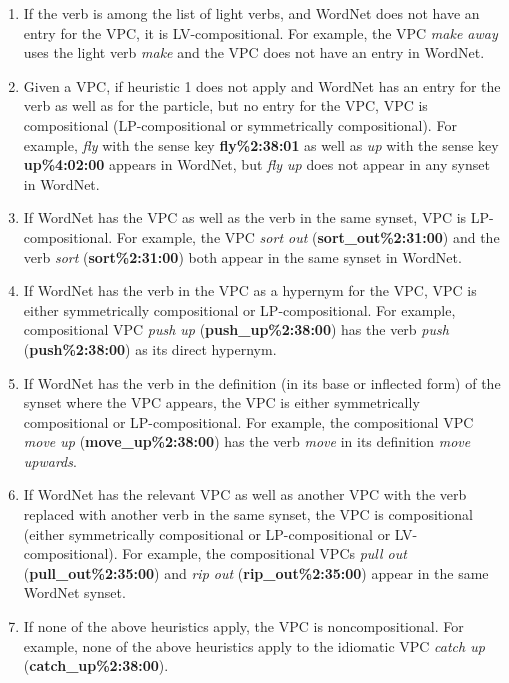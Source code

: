 \documentclass[output=paper
,modfonts
,nonflat]{langsci/langscibook}
\begin{document}
\begin{enumerate}
\setlength\itemsep{0em}
\item If the verb is among the list of light verbs, and WordNet does not have an entry for the VPC, it is LV-compositional. For example, the VPC \textit{make away} uses the light verb \textit{make} and the VPC does not have an entry in WordNet.

\item Given a VPC, if heuristic 1 does not apply and WordNet has an entry for the verb as well as for the particle, but no entry for the VPC, VPC is compositional (LP-compositional or symmetrically compositional). For example, \textit{fly} with the sense key \textbf{fly\%2:38:01} as well as \textit{up} with the sense key \textbf{up\%4:02:00} appears in WordNet, but \textit{fly up} does not appear in any synset in WordNet.

\item If WordNet has the VPC as well as the verb in the same synset, VPC is LP-compositional. For example, the VPC \textit{sort out} (\textbf{sort\_out\%2:31:00}) and the verb \textit{sort} (\textbf{sort\%2:31:00}) both appear in the same synset in WordNet.

\item If WordNet has the verb in the VPC as a hypernym for the VPC, VPC is either symmetrically compositional or LP-compositional. For example, compositional VPC \textit{push up} (\textbf{push\_up\%2:38:00}) has the verb \textit{push} (\textbf{push\%2:38:00}) as its direct hypernym.

\item If WordNet has the verb in the definition (in its base or inflected form) of the synset where the VPC appears, the VPC is either symmetrically compositional or LP-compositional. For example, the compositional VPC \textit{move up} (\textbf{move\_up\%2:38:00}) has the verb \textit{move} in its definition \textit{move upwards}.

\item If WordNet has the relevant VPC as well as another VPC with the verb replaced with another verb in the same synset, the VPC is compositional (either symmetrically compositional or LP-compositional or LV-compositional). For example, the compositional VPCs \textit{pull out} (\textbf{pull\_out\%2:35:00}) and \textit{rip out} (\textbf{rip\_out\%2:35:00}) appear in the same WordNet synset.

\item If none of the above heuristics apply, the VPC is noncompositional. For example, none of the above heuristics apply to the idiomatic VPC \textit{catch up} (\textbf{catch\_up\%2:38:00}).

\end{enumerate}
\end{document}
